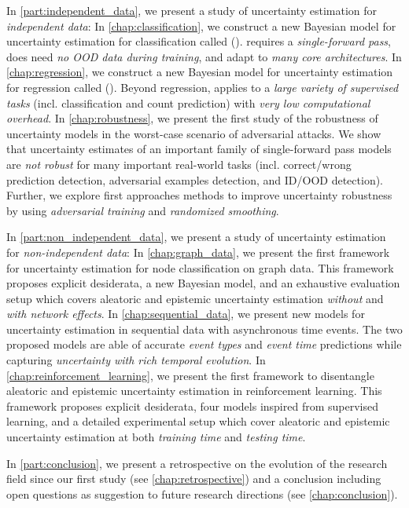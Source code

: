 In \cref{part:independent_data}, we present a study of uncertainty estimation for \emph{independent data}: 
In \cref{chap:classification}, we construct a new Bayesian model for uncertainty estimation for classification called \PostNet{} (\PostNetacro{}). \PostNetacro{} requires a \emph{single-forward pass}, does need \emph{no OOD data during training}, and adapt to \emph{many core architectures}.
In \cref{chap:regression}, we construct a new Bayesian model for uncertainty estimation for regression called \NatPN{} (\NatPNacro{}). Beyond regression, \NatPNacro{} applies to a \emph{large variety of supervised tasks} (incl. classification and count prediction) with \emph{very low computational overhead}.
In \cref{chap:robustness}, we present the first study of the robustness of uncertainty models in the worst-case scenario of adversarial attacks. We show that uncertainty estimates of an important family of single-forward pass models are \emph{not robust} for many important real-world tasks (incl. correct/wrong prediction detection, adversarial examples detection, and ID/OOD detection). Further, we explore first approaches methods to improve uncertainty robustness by using \emph{adversarial training} and \emph{randomized smoothing}. 

In \cref{part:non_independent_data}, we present a study of uncertainty estimation for \emph{non-independent data}:
In \cref{chap:graph_data}, we present the first framework for uncertainty estimation for node classification on graph data. This framework proposes explicit desiderata, a new Bayesian model, and an exhaustive evaluation setup which covers aleatoric and epistemic uncertainty estimation \emph{without} and \emph{with network effects}.
In \cref{chap:sequential_data}, we present new models for uncertainty estimation in sequential data with asynchronous time events. The two proposed models are able of accurate \emph{event types} and \emph{event time} predictions while capturing \emph{uncertainty with rich temporal evolution}.
In \cref{chap:reinforcement_learning}, we present the first framework to disentangle aleatoric and epistemic uncertainty estimation in reinforcement learning. This framework proposes explicit desiderata, four models inspired from supervised learning, and a detailed experimental setup which cover aleatoric and epistemic uncertainty estimation at both \emph{training time} and \emph{testing time}.

In \cref{part:conclusion}, we present a retrospective on the evolution of the research field since our first study (see \cref{chap:retrospective}) and a conclusion including open questions as suggestion to future research directions (see \cref{chap:conclusion}).


